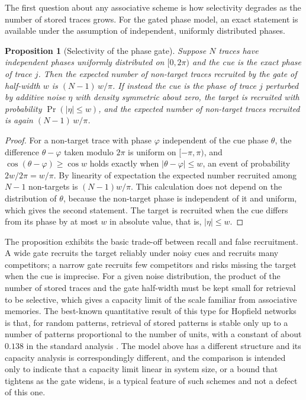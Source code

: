 \documentclass[11pt,twoside,openright]{book}
\theoremstyle{plain}
\newtheorem{proposition}[theorem]{Proposition}
\theoremstyle{definition}
\theoremstyle{remark}
\begin{document}
The first question about any associative scheme is how selectivity degrades as the number of stored traces grows. For the gated phase model, an exact statement is available under the assumption of independent, uniformly distributed phases.

\begin{proposition}[Selectivity of the phase gate]\label{prop:phasegate}
Suppose $N$ traces have independent phases uniformly distributed on $[0,2\pi)$ and the cue is the exact phase of trace $j$. Then the expected number of non-target traces recruited by the gate of half-width $w$ is $(N-1)\,w/\pi$. If instead the cue is the phase of trace $j$ perturbed by additive noise $\eta$ with density symmetric about zero, the target is recruited with probability $\Pr(|\eta|\le w)$, and the expected number of non-target traces recruited is again $(N-1)\,w/\pi$.
\end{proposition}

\begin{proof}
For a non-target trace with phase $\varphi$ independent of the cue phase $\theta$, the difference $\theta-\varphi$ taken modulo $2\pi$ is uniform on $[-\pi,\pi)$, and $\cos(\theta-\varphi)\ge\cos w$ holds exactly when $|\theta-\varphi|\le w$, an event of probability $2w/2\pi=w/\pi$. By linearity of expectation the expected number recruited among $N-1$ non-targets is $(N-1)w/\pi$. This calculation does not depend on the distribution of $\theta$, because the non-target phase is independent of it and uniform, which gives the second statement. The target is recruited when the cue differs from its phase by at most $w$ in absolute value, that is, $|\eta|\le w$.
\end{proof}

The proposition exhibits the basic trade-off between recall and false recruitment. A wide gate recruits the target reliably under noisy cues and recruits many competitors; a narrow gate recruits few competitors and risks missing the target when the cue is imprecise. For a given noise distribution, the product of the number of stored traces and the gate half-width must be kept small for retrieval to be selective, which gives a capacity limit of the scale familiar from associative memories. The best-known quantitative result of this type for Hopfield networks is that, for random patterns, retrieval of stored patterns is stable only up to a number of patterns proportional to the number of units, with a constant of about $0.138$ in the standard analysis \cite{amit1985}. The model above has a different structure and its capacity analysis is correspondingly different, and the comparison is intended only to indicate that a capacity limit linear in system size, or a bound that tightens as the gate widens, is a typical feature of such schemes and not a defect of this one.
\end{document}
